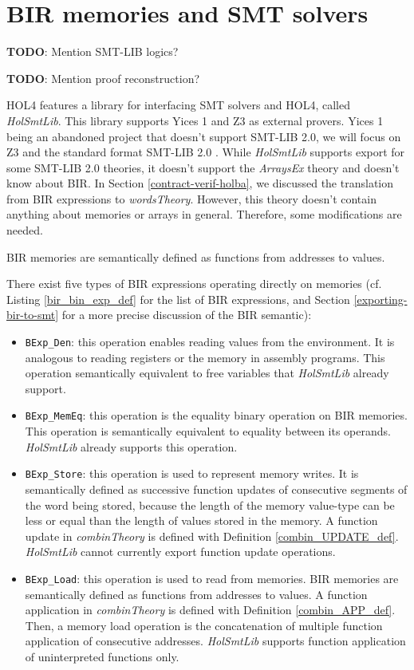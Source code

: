 \documentclass{kththesis}
\begin{document}

\section{BIR memories and SMT solvers} \label{bir-memories-with-smt-solvers}

\textbf{TODO}: Mention SMT-LIB logics?

\textbf{TODO}: Mention proof reconstruction?

HOL4 features a library for interfacing \gls{SMT} solvers and HOL4, called \textit{HolSmtLib}. This library supports Yices 1 and Z3 as external provers. Yices 1 being an abandoned project that doesn't support SMT-LIB 2.0, we will focus on Z3 and the standard format SMT-LIB 2.0 \cite{barrett_satisfiability_2016}. While \textit{HolSmtLib} supports export for some SMT-LIB 2.0 theories, it doesn't support the \textit{ArraysEx} theory and doesn't know about BIR. In Section \ref{contract-verif-holba}, we discussed the translation from BIR expressions to \textit{wordsTheory}. However, this theory doesn't contain anything about memories or arrays in general. Therefore, some modifications are needed.

BIR memories are semantically defined as functions from addresses to values. 

There exist five types of BIR expressions operating directly on memories (cf. Listing \ref{bir_bin_exp_def} for the list of BIR expressions, and Section \ref{exporting-bir-to-smt} for a more precise discussion of the BIR semantic):

\begin{itemize}
    \item \texttt{BExp\_Den}: this operation enables reading values from the environment. It is analogous to reading registers or the memory in assembly programs. This operation semantically equivalent to free variables that \textit{HolSmtLib} already support.
    \item \texttt{BExp\_MemEq}: this operation is the equality binary operation on BIR memories. This operation is semantically equivalent to equality between its operands. \textit{HolSmtLib} already supports this operation.
    \item \texttt{BExp\_Store}: this operation is used to represent memory writes. It is semantically defined as successive function updates of consecutive segments of the word being stored, because the length of the memory value-type can be less or equal than the length of values stored in the memory. A function update in \textit{combinTheory} is defined with Definition \ref{combin_UPDATE_def}. \textit{HolSmtLib} cannot currently export function update operations.
    \item \texttt{BExp\_Load}: this operation is used to read from memories. BIR memories are semantically defined as functions from addresses to values. A function application in \textit{combinTheory} is defined with Definition \ref{combin_APP_def}. Then, a memory load operation is the concatenation of multiple function application of consecutive addresses. \textit{HolSmtLib} supports function application of uninterpreted functions only.
\end{itemize}
\end{document}
